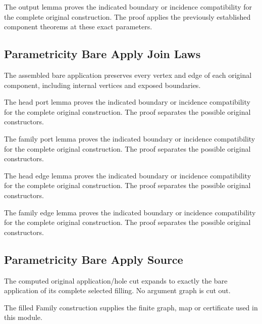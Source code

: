 The output lemma proves the indicated boundary or incidence compatibility for the complete original construction.
The proof applies the previously established component theorems at these exact parameters.
\par{}

\subsection{Parametricity Bare Apply Join Laws}
The assembled bare application preserves every vertex and edge of each
original component, including internal vertices and exposed boundaries.

The head port lemma proves the indicated boundary or incidence compatibility for the complete original construction.
The proof separates the possible original constructors.
\par{}

The family port lemma proves the indicated boundary or incidence compatibility for the complete original construction.
The proof separates the possible original constructors.
\par{}

The head edge lemma proves the indicated boundary or incidence compatibility for the complete original construction.
The proof separates the possible original constructors.
\par{}

The family edge lemma proves the indicated boundary or incidence compatibility for the complete original construction.
The proof separates the possible original constructors.
\par{}

\subsection{Parametricity Bare Apply Source}
The computed original application/hole cut expands to exactly the bare
application of its complete selected filling. No argument graph is cut out.

The filled Family construction supplies the finite graph, map or certificate used in this module.
\par{}


